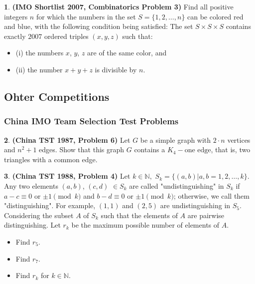 \documentclass{article}
\newcommand{\plus}{+}
\newcommand{\equal}{=}
\theoremstyle{definition}
\newtheorem{p}{}
\begin{document}
\begin{p}{\bf (IMO Shortlist 2007, Combinatorics Problem 3)}
Find all positive integers $ n$ for which the numbers in the set $ S \equal{} \{1,2, \ldots,n \}$ can be colored red and blue, with the following condition being satisfied: The set $ S \times S \times S$ contains exactly $ 2007$ ordered triples $ \left(x, y, z\right)$ such that:
\begin{itemize}
\item(i) the numbers $ x$, $ y$, $ z$ are of the same color, and
\item(ii) the number $ x \plus{} y \plus{} z$ is divisible by $ n$.
\end{itemize}
\end{p}




\subsection{Ohter Competitions}

\subsubsection{China IMO Team Selection Test Problems}

\begin{p}{\bf(China TST 1987, Problem 6)}
Let $ G$ be a simple graph with $ 2 \cdot n$ vertices and $ n^{2}+1$ edges. Show that this graph $ G$ contains a $ K_{4}-\text{one edge}$, that is, two triangles with a common edge.
\end{p}




\begin{p}{\bf(China TST 1988, Problem 4)}
Let $k \in \mathbb{N},$ $S_k = \{(a, b) | a, b = 1, 2, \ldots, k \}.$ Any two elements $(a, b)$, $(c, d)$ $\in S_k$ are called "undistinguishing" in $S_k$ if $a - c \equiv 0$ or $\pm 1 \pmod{k}$ and $b - d \equiv 0$ or $\pm 1 \pmod{k}$; otherwise, we call them "distinguishing". For example, $(1, 1)$ and $(2, 5)$ are undistinguishing in $S_5$. Considering the subset $A$ of $S_k$ such that the elements of $A$ are pairwise distinguishing. Let $r_k$ be the maximum possible number of elements of $A$.
\begin{itemize}
\item Find $r_5$.
\item Find $r_7$.
\item Find $r_k$ for $k \in \mathbb{N}$.
\end{itemize}
\end{p}
\end{document}
